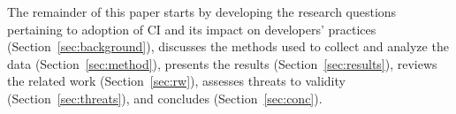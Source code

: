 The remainder of this paper starts by developing the research questions 
pertaining to adoption of CI and its impact on developers' practices 
(Section~\ref{sec:background}), discusses the methods used to collect 
and analyze the data (Section~\ref{sec:method}), presents the results 
(Section~\ref{sec:results}), reviews the related work (Section~\ref{sec:rw}),
assesses threats to validity (Section~\ref{sec:threats}), and concludes 
(Section~\ref{sec:conc}).






